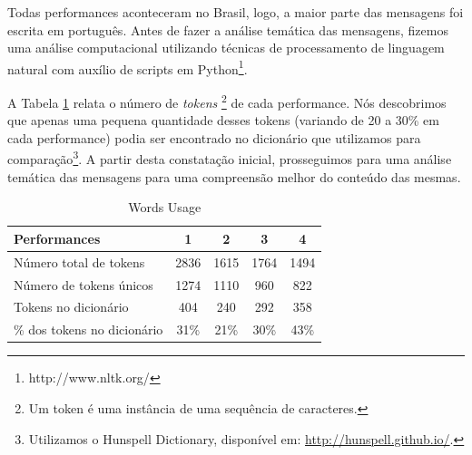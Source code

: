 Todas performances aconteceram no Brasil, logo, a maior parte das mensagens foi escrita em português. Antes de fazer a análise temática das mensagens, fizemos uma análise computacional utilizando técnicas de processamento de linguagem natural com auxílio de scripts em Python\footnote{http://www.nltk.org/}. 

A Tabela \ref{tab:words} relata o número de \emph{tokens} \footnote{Um token é uma instância de uma sequência de caracteres.} de cada performance. Nós descobrimos que apenas uma pequena quantidade desses tokens (variando de 20 a 30\% em cada performance) podia ser encontrado no dicionário que utilizamos para comparação\footnote{Utilizamos o Hunspell Dictionary, disponível em: \url{http://hunspell.github.io/}.}. A partir desta constatação inicial, prosseguimos para uma análise temática das mensagens para uma compreensão melhor do conteúdo das mesmas.




\begin{table}[ht!]
\caption{Words Usage}{%
\begin{tabular}{@{}lcccc@{}}
\hline
Performances & 1 & 2 & 3 & 4 \\
\hline
Número total de tokens&     2836&   1615&  1764&   1494\\
Número de tokens únicos& 1274& 1110& 960& 822\\
Tokens no dicionário &      404&   240&  292&   358\\
\% dos tokens no dicionário &       31\%&   21\%&  30\%&   43\%\\
\end{tabular}}
\label{tab:words}
\end{table}

